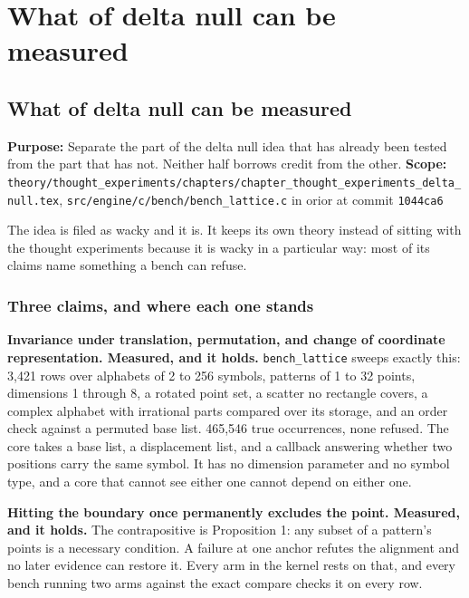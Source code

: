 \chapter{What of delta null can be measured}

\section{What of delta null can be measured}

\textbf{Purpose:} Separate the part of the delta null idea that has already been tested from the part that has not. Neither half borrows credit from the other. \textbf{Scope:} \texttt{theory/\allowbreak{}thought\_\allowbreak{}experiments/\allowbreak{}chapters/\allowbreak{}chapter\_\allowbreak{}thought\_\allowbreak{}experiments\_\allowbreak{}delta\_\allowbreak{}null.\allowbreak{}tex}, \texttt{src/\allowbreak{}engine/\allowbreak{}c/\allowbreak{}bench/\allowbreak{}bench\_\allowbreak{}lattice.\allowbreak{}c} in orior at commit \texttt{1044ca6}

The idea is filed as wacky and it is. It keeps its own theory instead of sitting with the thought experiments because it is wacky in a particular way: most of its claims name something a bench can refuse.

\subsection{Three claims, and where each one stands}

\textbf{Invariance under translation, permutation, and change of coordinate representation. Measured, and it holds.} \texttt{bench\_\allowbreak{}lattice} sweeps exactly this: 3,421 rows over alphabets of 2 to 256 symbols, patterns of 1 to 32 points, dimensions 1 through 8, a rotated point set, a scatter no rectangle covers, a complex alphabet with irrational parts compared over its storage, and an order check against a permuted base list. 465,546 true occurrences, none refused. The core takes a base list, a displacement list, and a callback answering whether two positions carry the same symbol. It has no dimension parameter and no symbol type, and a core that cannot see either one cannot depend on either one.

\textbf{Hitting the boundary once permanently excludes the point. Measured, and it holds.} The contrapositive is Proposition 1: any subset of a pattern's points is a necessary condition. A failure at one anchor refutes the alignment and no later evidence can restore it. Every arm in the kernel rests on that, and every bench running two arms against the exact compare checks it on every row.

